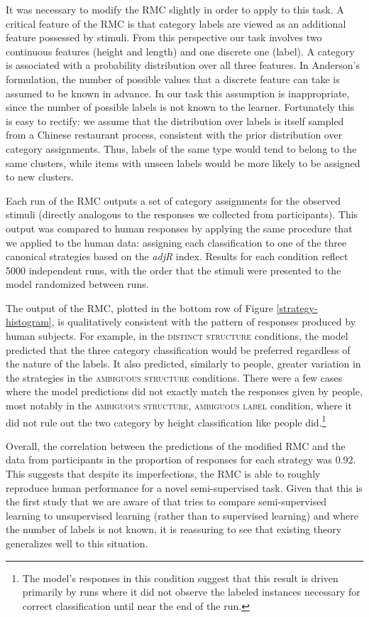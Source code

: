 \documentclass[a4paper, doc]{apa6}
\begin{document}
It was necessary to modify the RMC slightly in order to apply to this task.  A critical feature of the RMC is that category labels are viewed as an additional feature possessed by stimuli. From this perspective our task involves two continuous features (height and length) and one discrete one (label). A category is associated with a probability distribution over all three features. In Anderson's \citeyear{anderson1991adaptive} formulation, the number of possible values that a discrete feature can take is assumed to be known in advance.
In our task this assumption is inappropriate, since the number of possible labels is not known to the learner. Fortunately this is easy to rectify: we assume that the distribution over labels is itself sampled from a Chinese restaurant process, consistent with the prior distribution over category assignments. Thus, labels of the same type would tend to belong to the same clusters, while items with unseen labels would be more likely to be assigned to new clusters.

Each run of the RMC outputs a set of category assignments for the observed stimuli (directly analogous to the responses we collected from participants). This output was compared to human responses by applying the same procedure that we applied to the human data: assigning each classification to one of the three canonical strategies based on the {\it adjR} index. Results for each condition reflect 5000 independent runs, with the order that the stimuli were presented to the model randomized between runs.

The output of the RMC, plotted in the bottom row of Figure \ref{strategy-histogram}, is qualitatively consistent with the pattern of responses produced by human subjects. For example, in the \textsc{distinct structure} conditions, the model predicted that the three category classification would be preferred regardless of the nature of the labels. It also predicted, similarly to people, greater variation in the strategies in the \textsc{ambiguous structure} conditions. There were a few cases where the model predictions did not exactly match the responses given by people, most notably in the \textsc{ambiguous structure, ambiguous label} condition, where it did not rule out the two category by height classification like people did.\footnote{The model's responses in this condition suggest that this result is driven primarily by runs where it did not observe the labeled instances necessary for correct classification until near the end of the run.}

Overall, the correlation between the predictions of the modified RMC and the data from participants in the proportion of responses for each strategy was 0.92. This suggests that despite its imperfections, the RMC is able to roughly reproduce human performance for a novel semi-supervised task.  Given that this is the first study that we are aware of that tries to compare semi-supervised learning to unsupervised learning (rather than to supervised learning) and where the number of labels is not known, it is reassuring to see that existing theory generalizes well to this situation.
\end{document}
